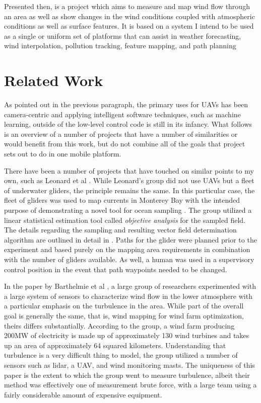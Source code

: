 \documentclass[12pt]{report}
\begin{document}
	Presented then, is a project which aims to measure and map wind flow through an area as well as show changes in the wind conditions coupled with atmospheric conditions as well as surface features. It is based on a system I intend to be used as a single or uniform set of platforms that can assist in weather forecasting, wind interpolation, pollution tracking, feature mapping, and path planning 

\section{Related Work}
As pointed out in the previous paragraph, the primary uses for UAVs has been camera-centric and applying intelligent software techniques, such as machine learning, outside of the low-level control code is still in its infancy. What follows is an overview of a number of projects that have a number of similarities or would benefit from this work, but do not combine all of the goals that project sets out to do in one mobile platform.

There have been a number of projects that have touched on similar points to my own, such as Leonard et al \cite{Leonard10}. While Leonard's group did not use UAVs but a fleet of underwater gliders, the principle remains the same. In this particular case, the fleet of gliders was used to map currents in Monterey Bay with the intended purpose of demonstrating a novel tool for ocean sampling \cite{Leonard10}. The group utilized a linear statistical estimation tool called \emph{objective analysis} for the sampled field. The details regarding the sampling and resulting vector field determination algorithm are outlined in detail in \cite{Bretherton75}. Paths for the glider were planned prior to the experiment and based purely on the mapping area requirements in combination with the number of gliders available. As well, a human was used in a supervisory control position in the event that path waypoints needed to be changed.

In the paper by Barthelmie et al \cite{Barthelmie14}, a large group of researchers experimented with a large system of sensors to characterize wind flow in the lower atmosphere with a particular emphasis on the turbulence in the area. While part of the overall goal is generally the same, that is, wind mapping for wind farm optimization, theirs differs substantially. According to the group, a wind farm producing 200MW of electricity is made up of approximately 130 wind turbines and takes up an area of approximately 64 squared kilometers. Understanding that turbulence is a very difficult thing to model, the group utilized a number of sensors such as lidar, a UAV, and wind monitoring masts. The uniqueness of this paper is the extent to which the group went to measure turbulence, albeit their method was effectively one of measurement brute force, with a large team using a fairly considerable amount of expensive equipment.	
\end{document}
